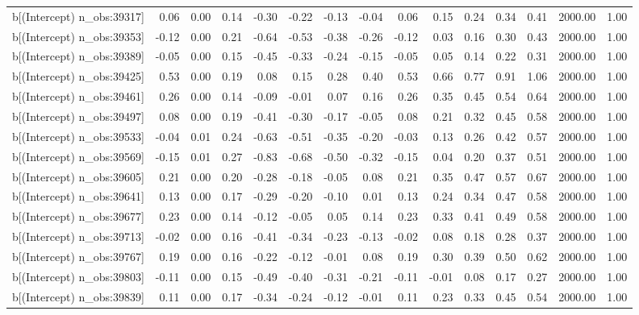 \begin{table}[ht]
\begin{tabular}{rrrrrrrrrrrrrrr}
  b[(Intercept) n\_obs:39317] & 0.06 & 0.00 & 0.14 & -0.30 & -0.22 & -0.13 & -0.04 & 0.06 & 0.15 & 0.24 & 0.34 & 0.41 & 2000.00 & 1.00 \\ 
  b[(Intercept) n\_obs:39353] & -0.12 & 0.00 & 0.21 & -0.64 & -0.53 & -0.38 & -0.26 & -0.12 & 0.03 & 0.16 & 0.30 & 0.43 & 2000.00 & 1.00 \\ 
  b[(Intercept) n\_obs:39389] & -0.05 & 0.00 & 0.15 & -0.45 & -0.33 & -0.24 & -0.15 & -0.05 & 0.05 & 0.14 & 0.22 & 0.31 & 2000.00 & 1.00 \\ 
  b[(Intercept) n\_obs:39425] & 0.53 & 0.00 & 0.19 & 0.08 & 0.15 & 0.28 & 0.40 & 0.53 & 0.66 & 0.77 & 0.91 & 1.06 & 2000.00 & 1.00 \\ 
  b[(Intercept) n\_obs:39461] & 0.26 & 0.00 & 0.14 & -0.09 & -0.01 & 0.07 & 0.16 & 0.26 & 0.35 & 0.45 & 0.54 & 0.64 & 2000.00 & 1.00 \\ 
  b[(Intercept) n\_obs:39497] & 0.08 & 0.00 & 0.19 & -0.41 & -0.30 & -0.17 & -0.05 & 0.08 & 0.21 & 0.32 & 0.45 & 0.58 & 2000.00 & 1.00 \\ 
  b[(Intercept) n\_obs:39533] & -0.04 & 0.01 & 0.24 & -0.63 & -0.51 & -0.35 & -0.20 & -0.03 & 0.13 & 0.26 & 0.42 & 0.57 & 2000.00 & 1.00 \\ 
  b[(Intercept) n\_obs:39569] & -0.15 & 0.01 & 0.27 & -0.83 & -0.68 & -0.50 & -0.32 & -0.15 & 0.04 & 0.20 & 0.37 & 0.51 & 2000.00 & 1.00 \\ 
  b[(Intercept) n\_obs:39605] & 0.21 & 0.00 & 0.20 & -0.28 & -0.18 & -0.05 & 0.08 & 0.21 & 0.35 & 0.47 & 0.57 & 0.67 & 2000.00 & 1.00 \\ 
  b[(Intercept) n\_obs:39641] & 0.13 & 0.00 & 0.17 & -0.29 & -0.20 & -0.10 & 0.01 & 0.13 & 0.24 & 0.34 & 0.47 & 0.58 & 2000.00 & 1.00 \\ 
  b[(Intercept) n\_obs:39677] & 0.23 & 0.00 & 0.14 & -0.12 & -0.05 & 0.05 & 0.14 & 0.23 & 0.33 & 0.41 & 0.49 & 0.58 & 2000.00 & 1.00 \\ 
  b[(Intercept) n\_obs:39713] & -0.02 & 0.00 & 0.16 & -0.41 & -0.34 & -0.23 & -0.13 & -0.02 & 0.08 & 0.18 & 0.28 & 0.37 & 2000.00 & 1.00 \\ 
  b[(Intercept) n\_obs:39767] & 0.19 & 0.00 & 0.16 & -0.22 & -0.12 & -0.01 & 0.08 & 0.19 & 0.30 & 0.39 & 0.50 & 0.62 & 2000.00 & 1.00 \\ 
  b[(Intercept) n\_obs:39803] & -0.11 & 0.00 & 0.15 & -0.49 & -0.40 & -0.31 & -0.21 & -0.11 & -0.01 & 0.08 & 0.17 & 0.27 & 2000.00 & 1.00 \\ 
  b[(Intercept) n\_obs:39839] & 0.11 & 0.00 & 0.17 & -0.34 & -0.24 & -0.12 & -0.01 & 0.11 & 0.23 & 0.33 & 0.45 & 0.54 & 2000.00 & 1.00 \\ 

\end{tabular}
\end{table}
